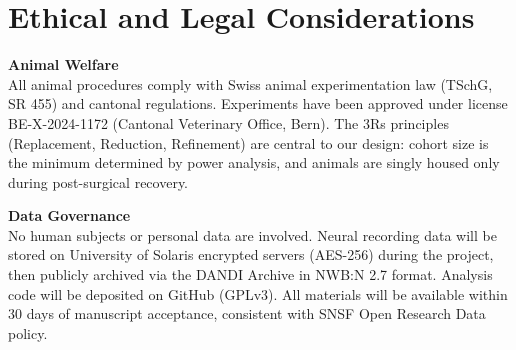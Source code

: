 \section{Ethical and Legal Considerations}

\begin{minipage}[t]{0.47\linewidth}
  \begin{tcolorbox}[snsfsidebar]
    {\small\bfseries\color{SNSFnavy}\faBalanceScale\quad Animal Welfare}\\[4pt]
    {\small
    All animal procedures comply with Swiss animal experimentation law (TSchG, SR 455) and
    cantonal regulations. Experiments have been approved under license BE-X-2024-1172
    (Cantonal Veterinary Office, Bern). The 3Rs principles (Replacement, Reduction,
    Refinement) are central to our design: cohort size is the minimum determined by power
    analysis, and animals are singly housed only during post-surgical recovery.
    }
  \end{tcolorbox}
\end{minipage}\hfill
\begin{minipage}[t]{0.47\linewidth}
  \begin{tcolorbox}[snsfsidebar]
    {\small\bfseries\color{SNSFnavy}\faLock\quad Data Governance}\\[4pt]
    {\small
    No human subjects or personal data are involved. Neural recording data will be
    stored on University of Solaris encrypted servers (AES-256) during the project,
    then publicly archived via the DANDI Archive in NWB:N 2.7 format. Analysis code
    will be deposited on GitHub (GPLv3). All materials will be available within 30 days
    of manuscript acceptance, consistent with SNSF Open Research Data policy.
    }
  \end{tcolorbox}
\end{minipage}

\par
\vspace{10pt}

